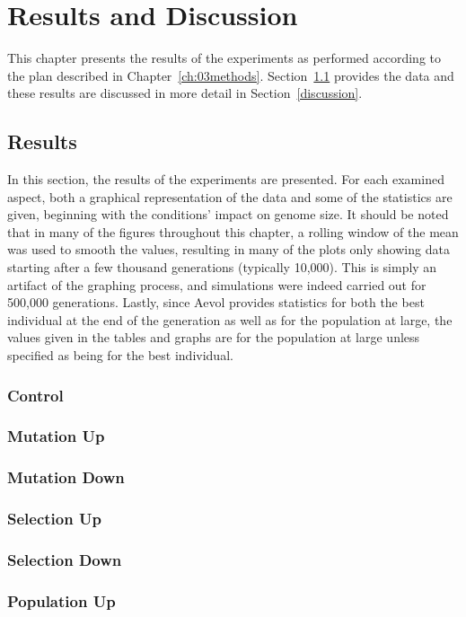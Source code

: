 \chapter{Results and Discussion}\label{ch:04results_discussion}

This chapter presents the results of the experiments as performed according to the plan described in Chapter~\ref{ch:03methods}. Section~\ref{results} provides the data and these results are discussed in more detail in Section~\ref{discussion}. 

\section{Results}\label{results}
In this section, the results of the experiments are presented. For each examined aspect, both a graphical representation of the data and some of the statistics are given, beginning with the conditions' impact on genome size. It should be noted that in many of the figures throughout this chapter, a rolling window of the mean was used to smooth the values, resulting in many of the plots only showing data starting after a few thousand generations (typically 10,000). This is simply an artifact of the graphing process, and simulations were indeed carried out for 500,000 generations. Lastly, since Aevol provides statistics for both the best individual at the end of the generation as well as for the population at large, the values given in the tables and graphs are for the population at large unless specified as being for the best individual. 
\subsection{Control}
\subsection{Mutation Up}
\subsection{Mutation Down}
\subsection{Selection Up}
\subsection{Selection Down}
\subsection{Population Up}
